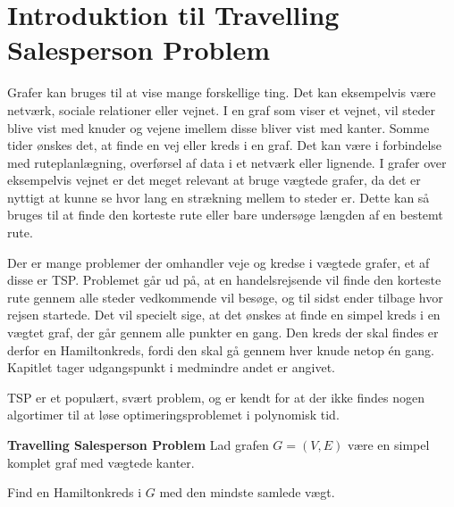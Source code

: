 \section{Introduktion til Travelling Salesperson Problem}
Grafer kan bruges til at vise mange forskellige ting. 
Det kan eksempelvis være netværk, sociale relationer eller vejnet. 
I en graf som viser et vejnet, vil steder blive vist med knuder og vejene imellem disse bliver vist med kanter.
Somme tider ønskes det, at finde en vej eller kreds i en graf.
Det kan være i forbindelse med ruteplanlægning, overførsel af data i et netværk eller lignende. 
I grafer over eksempelvis vejnet er det meget relevant at bruge vægtede grafer, da det er nyttigt at kunne se hvor lang en strækning mellem to steder er.
Dette kan så bruges til at finde den korteste rute eller bare undersøge længden af en bestemt rute. 

Der er mange problemer der omhandler veje og kredse i vægtede grafer, et af disse er TSP.
Problemet går ud på, at en handelsrejsende vil finde den korteste rute gennem alle steder vedkommende vil besøge, og til sidst ender tilbage hvor rejsen startede.
Det vil specielt sige, at det ønskes at finde en simpel kreds i en vægtet graf, der går gennem alle punkter en gang. 
Den kreds der skal findes er derfor en Hamiltonkreds, fordi den skal gå gennem hver knude netop én gang. Kapitlet tager udgangspunkt i \citep{metrictsp} medmindre andet er angivet.

TSP er et populært, svært problem, og er kendt for at der ikke findes nogen algortimer til at løse optimeringsproblemet i polynomisk tid. 

\begin{tcolorbox}
	\textbf{Travelling Salesperson Problem} \quad Lad grafen $G=(V,E)$ være en simpel komplet graf med vægtede kanter.

	Find en Hamiltonkreds i $G$ med den mindste samlede vægt.
\end{tcolorbox}